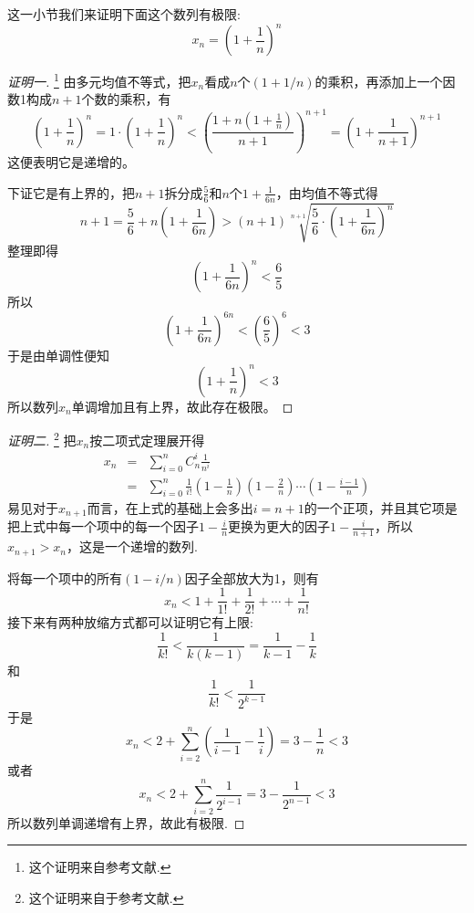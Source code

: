 这一小节我们来证明下面这个数列有极限:
\[ x_n=\left( 1+\frac{1}{n} \right)^n \]

\begin{proof}[证明一]\footnote{这个证明来自参考文献\cite{olympic-math}.}
  由多元均值不等式，把$x_n$看成$n$个$(1+1/n)$的乘积，再添加上一个因数1构成$n+1$个数的乘积，有
  \[ \left( 1+\frac{1}{n} \right)^n = 1 \cdot \left( 1+\frac{1}{n} \right)^n < \left( \frac{1+n\left( 1+\frac{1}{n} \right)}{n+1} \right)^{n+1} = \left( 1+\frac{1}{n+1} \right)^{n+1} \]
  这便表明它是递增的。

  下证它是有上界的，把$n+1$拆分成$\frac{5}{6}$和$n$个$1+\frac{1}{6n}$，由均值不等式得
  \[ n+1 = \frac{5}{6} + n \left( 1+\frac{1}{6n} \right) > (n+1)\sqrt[n+1]{\frac{5}{6} \cdot \left( 1+\frac{1}{6n} \right)^n} \]
  整理即得
  \[ \left( 1+\frac{1}{6n} \right)^n < \frac{6}{5} \]
  所以
  \[ \left( 1+\frac{1}{6n} \right)^{6n} < \left( \frac{6}{5} \right)^6 < 3 \]
  于是由单调性便知
  \[ \left( 1+\frac{1}{n} \right)^n < 3 \]
  所以数列$x_n$单调增加且有上界，故此存在极限。
\end{proof}

\begin{proof}[证明二]\footnote{这个证明来自于参考文献\cite{math-analysis}.}
  把$x_n$按二项式定理展开得
  \begin{eqnarray*}
    x_n & = & \sum_{i=0}^n C_n^i \frac{1}{n^i} \\
    & = & \sum_{i=0}^n \frac{1}{i!}\left( 1-\frac{1}{n} \right) \left( 1-\frac{2}{n} \right)\cdots \left( 1-\frac{i-1}{n} \right)
  \end{eqnarray*}
  易见对于$x_{n+1}$而言，在上式的基础上会多出$i=n+1$的一个正项，并且其它项是把上式中每一个项中的每一个因子$1-\frac{i}{n}$更换为更大的因子$1-\frac{i}{n+1}$，所以$x_{n+1}>x_n$，这是一个递增的数列.

  将每一个项中的所有$(1-i/n)$因子全部放大为1，则有
  \[  x_n < 1+\frac{1}{1!}+\frac{1}{2!}+\cdots+\frac{1}{n!} \]
  接下来有两种放缩方式都可以证明它有上限:
  \[ \frac{1}{k!} < \frac{1}{k(k-1)} = \frac{1}{k-1} - \frac{1}{k} \]
  和
  \[ \frac{1}{k!} < \frac{1}{2^{k-1}} \]
  于是
  \[ x_n < 2 + \sum_{i=2}^n \left( \frac{1}{i-1}-\frac{1}{i} \right) = 3-\frac{1}{n} < 3 \]
  或者
  \[ x_n < 2 + \sum_{i=2}^n \frac{1}{2^{i-1}} = 3-\frac{1}{2^{n-1}} < 3 \]
  所以数列单调递增有上界，故此有极限.
\end{proof}

